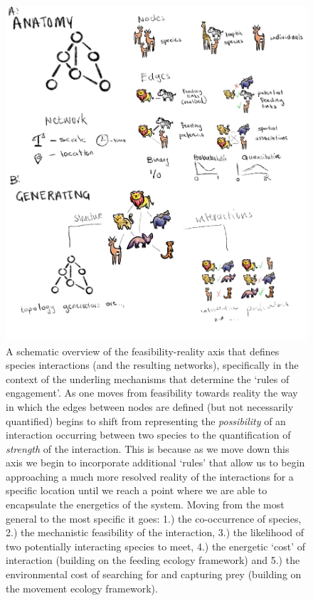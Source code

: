 \documentclass[
]{article}
\begin{document}
\begin{tcolorbox}
\begin{figure}[H]
{\includegraphics{images/concept_2.png}

}

\caption{\label{fig-feasibility}A schematic overview of the
feasibility-reality axis that defines species interactions (and the
resulting networks), specifically in the context of the underling
mechanisms that determine the `rules of engagement'. As one moves from
feasibility towards reality the way in which the edges between nodes are
defined (but not necessarily quantified) begins to shift from
representing the \emph{possibility} of an interaction occurring between
two species to the quantification of \emph{strength} of the interaction.
This is because as we move down this axis we begin to incorporate
additional `rules' that allow us to begin approaching a much more
resolved reality of the interactions for a specific location until we
reach a point where we are able to encapsulate the energetics of the
system. Moving from the most general to the most specific it goes: 1.)
the co-occurrence of species, 2.) the mechanistic feasibility of the
interaction, 3.) the likelihood of two potentially interacting species
to meet, 4.) the energetic `cost' of interaction (building on the
feeding ecology framework) and 5.) the environmental cost of searching
for and capturing prey (building on the movement ecology framework).}


\end{figure}
\end{tcolorbox}
\end{document}

